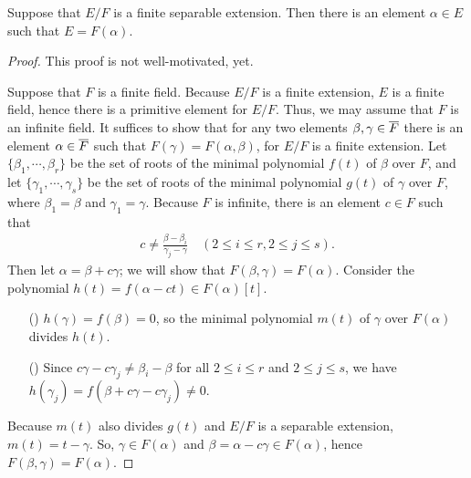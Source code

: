 \begin{thm}\label{primitive element theorem}
    Suppose that $E/F$ is a finite separable extension.
    Then there is an element $\alpha\in E$ such that $E=F(\alpha)$.
\end{thm}
\begin{proof}
    \color{teal}This proof is not well-motivated, yet.\color{black}

    Suppose that $F$ is a finite field.
    Because $E/F$ is a finite extension, $E$ is a finite field, hence there is a primitive element for $E/F$.
    Thus, we may assume that $F$ is an infinite field.
    It suffices to show that for any two elements $\beta, \gamma\in \overline{F}$ there is an element $\alpha\in \overline{F}$ such that $F(\gamma)=F(\alpha, \beta)$, for $E/F$ is a finite extension.
    Let $\{\beta_1, \cdots, \beta_r\}$ be the set of roots of the minimal polynomial $f(t)$ of $\beta$ over $F$, and let $\{\gamma_1, \cdots, \gamma_s\}$ be the set of roots of the minimal polynomial $g(t)$ of $\gamma$ over $F$, where $\beta_1=\beta$ and $\gamma_1=\gamma$.
    Because $F$ is infinite, there is an element $c\in F$ such that
    \begin{align*}
        c\neq\frac{\beta-\beta_i}{\gamma_j-\gamma}\quad(2\leq i\leq r, 2\leq j\leq s).
    \end{align*}
    Then let $\alpha=\beta+c\gamma$; we will show that $F(\beta, \gamma)=F(\alpha)$.
    Consider the polynomial $h(t)=f(\alpha-ct)\in F(\alpha)[t]$.
    \begin{enumerate}
        \item[(\romannumeral 1)]
        {
            $h(\gamma)=f(\beta)=0$, so the minimal polynomial $m(t)$ of $\gamma$ over $F(\alpha)$ divides $h(t)$.
        }
        \item[(\romannumeral 2)]
        {
            Since $c\gamma-c\gamma_j\neq\beta_i-\beta$ for all $2\leq i\leq r$ and $2\leq j\leq s$, we have $h(\gamma_j)=f(\beta+c\gamma-c\gamma_j)\neq 0$.
        }
    \end{enumerate}
    Because $m(t)$ also divides $g(t)$ and $E/F$ is a separable extension, $m(t)=t-\gamma$.
    So, $\gamma\in F(\alpha)$ and $\beta=\alpha-c\gamma\in F(\alpha)$, hence $F(\beta, \gamma)=F(\alpha)$.
\end{proof}